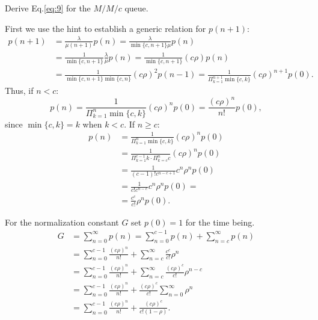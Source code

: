 \begin{question}
  Derive Eq.\eqref{eq:9} for the $M/M/c$ queue.


  \begin{solution}
First we use the hint to  establish a generic relation for $p(n+1)$:
    \begin{equation*}
      \begin{split}
       p(n+1) 
&= \frac{\lambda}{\mu(n+1)}p(n) 
= \frac{\lambda}{\min\{c, n+1\} \mu }p(n) \\
&= \frac{1}{\min\{c, n+1\}}\frac\lambda\mu p(n) 
= \frac{1}{\min\{c, n+1\}}(c\rho) p(n) \\
&= \frac{1}{\min\{c, n+1\}\min\{c, n\}}(c\rho)^2 p(n-1) 
= \frac{1}{\Pi_{k=1}^{n+1}\min\{c, k\}}(c\rho)^{n+1} p(0).
      \end{split}
    \end{equation*}
Thus, if $n<c$:
\begin{equation*}
  p(n) = \frac{1}{\Pi_{k=1}^{n}\min\{c, k\}}(c\rho)^{n} p(0) = \frac{(c\rho)^n}{n!} p(0),
\end{equation*}
since $\min\{c,k\}=k$ when $k<c$. If $n\geq c$:
\begin{equation*}
  \begin{split}
  p(n) 
&= \frac{1}{\Pi_{k=1}^{n}\min\{c, k\}}(c\rho)^{n} p(0) \\
&= \frac{1}{\Pi_{k=1}^{c-1} k \cdot \Pi_{k=c}^{n} c}(c\rho)^{n} p(0) \\
&= \frac{1}{(c-1)! c^{n-c+1}}c^n\rho^{n} p(0) \\
&= \frac{1}{c! c^{n-c}}c^n\rho^{n} p(0) = \\
&= \frac{c^c}{c!}\rho^{n} p(0).
  \end{split}
\end{equation*}


For the normalization constant $G$ set $p(0)=1$ for the time being. 
\begin{equation*}
  \begin{split}
G &= \sum_{n=0}^\infty p(n) 
= \sum_{n=0}^{c-1} p(n) + \sum_{n=c}^\infty p(n) \\
&=\sum_{n=0}^{c-1}\frac{(c\rho)^n}{n!} + 
 \sum_{n=c}^{\infty} \frac{c^c}{c!} \rho^{n}  \\
&=\sum_{n=0}^{c-1}\frac{(c\rho)^n}{n!} + 
 \sum_{n=c}^{\infty} \frac{(c\rho)^c}{c!} \rho^{n-c}  \\
&= 
\sum_{n=0}^{c-1}\frac{(c\rho)^n}{n!} + 
\frac{(c\rho)^c}{c!} \sum_{n=0}^{\infty} \rho^n \\
&= 
\sum_{n=0}^{c-1}\frac{(c\rho)^n}{n!} + 
\frac{(c\rho)^c}{c!(1-\rho)}.
  \end{split}
\end{equation*}



\end{solution}
\end{question}
